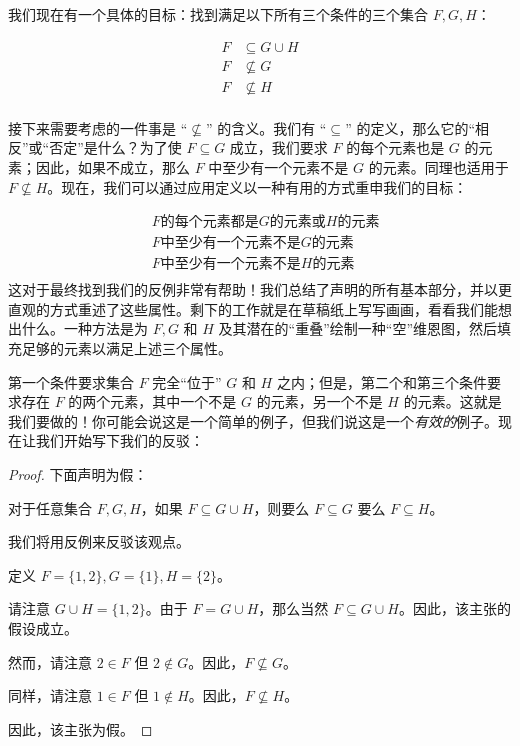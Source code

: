 我们现在有一个具体的目标：找到满足以下所有三个条件的三个集合 $F,G,H$：

\begin{align*}
    F &\subseteq G \cup H \\
    F &\nsubseteq G \\
    F &\nsubseteq H \\
\end{align*}

接下来需要考虑的一件事是 ``$\nsubseteq$'' 的含义。我们有 ``$\subseteq$'' 的定义，那么它的``相反''或``否定''是什么？为了使 $F \subseteq G$ 成立，我们要求 $F$ 的每个元素也是 $G$ 的元素；因此，如果不成立，那么 $F$ 中至少有一个元素不是 $G$ 的元素。同理也适用于 $F \nsubseteq H$。现在，我们可以通过应用定义以一种有用的方式重申我们的目标：

\begin{align*}
    &F \text{的每个元素都是} G \text{的元素或} H \text{的元素} \\
    &F \text{中至少有一个元素不是} G \text{的元素} \\
    &F \text{中至少有一个元素不是} H \text{的元素} \\
\end{align*}
这对于最终找到我们的反例非常有帮助！我们总结了声明的所有基本部分，并以更直观的方式重述了这些属性。剩下的工作就是在草稿纸上写写画画，看看我们能想出什么。一种方法是为 $F, G$ 和 $H$ 及其潜在的``重叠''绘制一种``空''维恩图，然后填充足够的元素以满足上述三个属性。

第一个条件要求集合 $F$ 完全``位于'' $G$ 和 $H$ 之内；但是，第二个和第三个条件要求存在 $F$ 的两个元素，其中一个不是 $G$ 的元素，另一个不是 $H$ 的元素。这就是我们要做的！你可能会说这是一个简单的例子，但我们说这是一个\emph{有效的}例子。现在让我们开始写下我们的反驳：

\begin{proof}
    下面声明为假：
    \begin{center}
        对于任意集合 $F, G, H$，如果 $F \subseteq G \cup H$，则要么 $F \subseteq G$ 要么 $F \subseteq H$。
    \end{center}
    我们将用反例来反驳该观点。

    定义 $F = \{1, 2\}, G = \{1\}, H = \{2\}$。

    请注意 $G \cup H = \{1, 2\}$。由于 $F = G \cup H$，那么当然 $F \subseteq G \cup H$。因此，该主张的假设成立。

    然而，请注意 $2 \in F$ 但 $2 \notin G$。因此，$F \nsubseteq G$。

    同样，请注意 $1 \in F$ 但 $1 \notin H$。因此，$F \nsubseteq H$。

    因此，该主张为假。
\end{proof}

